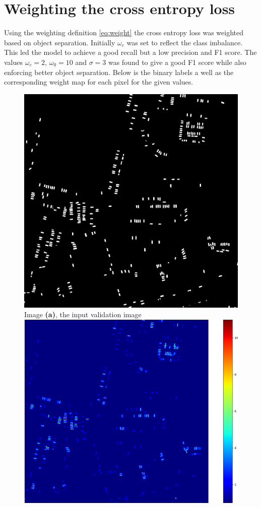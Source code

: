 \documentclass{kththesis}
\begin{document}
\section{Weighting the cross entropy loss}
Using the weighting definition \ref{eq:weight} the cross entropy loss was weighted based on object separation. Initially $\omega_c$ was set to reflect the class imbalance. This led the model to achieve a good recall but a low precision and F1 score. The values $\omega_c =2$, $\omega_0=10$ and $\sigma=3$ was found to give a good F1 score while also enforcing better object separation. Below is the binary labels a well as the corresponding weight map for each pixel for the given values.
\begin{figure}[H]
  \includegraphics[width=\linewidth]{weight_labels}
  Image \textbf{(a)}, the input validation image
\endminipage\hfill
{}
  \includegraphics[width=\linewidth]{weight_map_3}

\end{figure}
\end{document}

